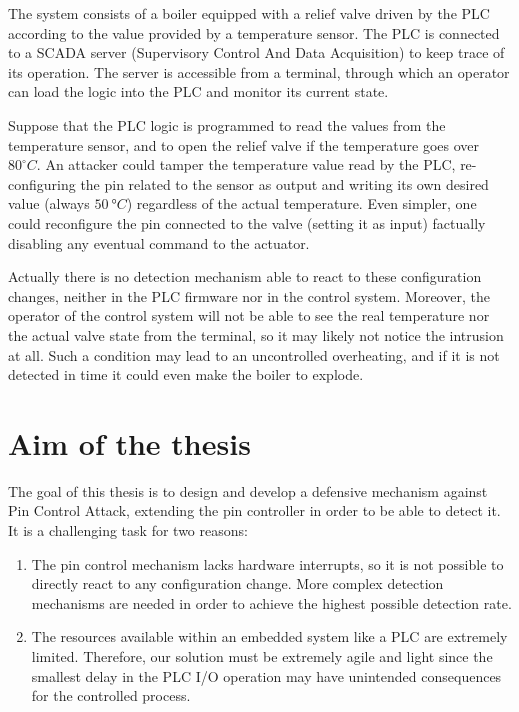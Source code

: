 The system consists of a boiler equipped with a relief valve driven by the PLC according to the value provided by a temperature sensor.
The PLC is connected to a SCADA server (Supervisory Control And Data Acquisition) to keep trace of its operation.
The server is accessible from a terminal, through which an operator can load the logic into the PLC and monitor its current state.

Suppose that the PLC logic is programmed to read the values from the temperature sensor, and to open the relief valve if the temperature goes over $80^\circ C$.
An attacker could tamper the temperature value read by the PLC, re-configuring the pin related to the sensor as output and writing its own desired value
(\eg always $\SI{50}{\degree C}$) regardless of the actual temperature.
Even simpler, one could reconfigure the pin connected to the valve (\eg setting it as input) factually disabling any eventual command to the actuator.

Actually there is no detection mechanism able to react to these configuration changes, neither in the PLC firmware nor in the control system.
Moreover, the operator of the control system will not be able to see the real temperature nor the actual valve state from the terminal,
so it may likely not notice the intrusion at all.
Such a condition may lead to an uncontrolled overheating, and if it is not detected in time it could even make the boiler to explode.


\section{Aim of the thesis}

The goal of this thesis is to design and develop a defensive mechanism against Pin Control Attack, extending the pin controller in order to be able to detect it.
It is a challenging task for two reasons:
\begin{enumerate}
	\item The pin control mechanism lacks hardware interrupts, so it is not possible to directly react to any configuration change. More complex detection mechanisms are needed
		in order to achieve the highest possible detection rate.
	\item The resources available within an embedded system like a PLC are extremely limited. Therefore, our solution must be extremely agile and light
		since the smallest delay in the PLC I/O operation may have unintended consequences for the controlled process.
\end{enumerate}

